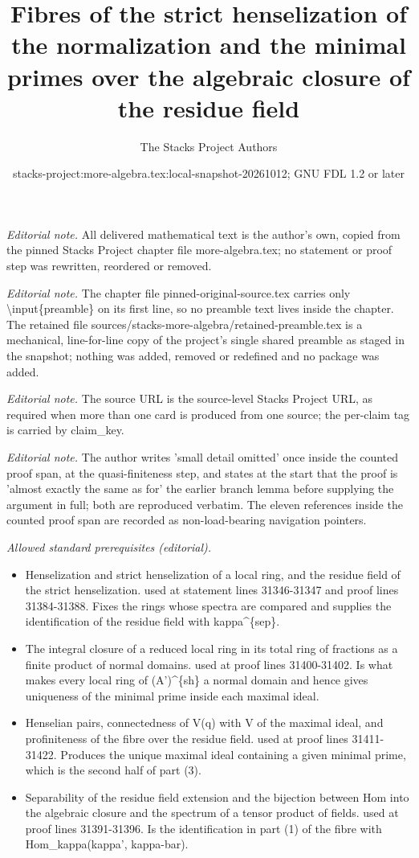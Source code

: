 \documentclass[10pt,a4paper]{amsart}
\title{Fibres of the strict henselization of the normalization and the minimal primes over the algebraic closure of the residue field}
\author{The Stacks Project Authors}
\date{stacks-project:more-algebra.tex:local-snapshot-20261012; GNU FDL 1.2 or later}
\theoremstyle{plain}
\theoremstyle{definition}
\theoremstyle{remark}
\numberwithin{equation}{subsection}
\begin{document}
\maketitle
\setcounter{subsection}{1}
\noindent\textit{Editorial note.} All delivered mathematical text is the author's own, copied from the pinned Stacks Project chapter file more-algebra.tex; no statement or proof step was rewritten, reordered or removed.\par\medskip
\noindent\textit{Editorial note.} The chapter file pinned-original-source.tex carries only \textbackslash{}input\{preamble\} on its first line, so no preamble text lives inside the chapter. The retained file sources/stacks-more-algebra/retained-preamble.tex is a mechanical, line-for-line copy of the project's single shared preamble as staged in the snapshot; nothing was added, removed or redefined and no package was added.\par\medskip
\noindent\textit{Editorial note.} The source URL is the source-level Stacks Project URL, as required when more than one card is produced from one source; the per-claim tag is carried by claim\_key.\par\medskip
\noindent\textit{Editorial note.} The author writes 'small detail omitted' once inside the counted proof span, at the quasi-finiteness step, and states at the start that the proof is 'almost exactly the same as for' the earlier branch lemma before supplying the argument in full; both are reproduced verbatim. The eleven references inside the counted proof span are recorded as non-load-bearing navigation pointers.\par\medskip
\noindent\textit{Allowed standard prerequisites (editorial).}\begin{itemize}
\item Henselization and strict henselization of a local ring, and the residue field of the strict henselization. used at statement lines 31346-31347 and proof lines 31384-31388. Fixes the rings whose spectra are compared and supplies the identification of the residue field with kappa\textasciicircum{}\{sep\}.
\item The integral closure of a reduced local ring in its total ring of fractions as a finite product of normal domains. used at proof lines 31400-31402. Is what makes every local ring of (A')\textasciicircum{}\{sh\} a normal domain and hence gives uniqueness of the minimal prime inside each maximal ideal.
\item Henselian pairs, connectedness of V(q) with V of the maximal ideal, and profiniteness of the fibre over the residue field. used at proof lines 31411-31422. Produces the unique maximal ideal containing a given minimal prime, which is the second half of part (3).
\item Separability of the residue field extension and the bijection between Hom into the algebraic closure and the spectrum of a tensor product of fields. used at proof lines 31391-31396. Is the identification in part (1) of the fibre with Hom\_kappa(kappa', kappa-bar).
\end{itemize}\medskip
\end{document}
